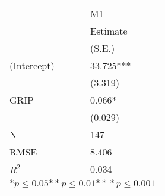\begin{tabular}{*{2}{l}}
\hline
                  & M1   \tabularnewline
                   &Estimate \tabularnewline
                 &(S.E.) \tabularnewline
 \hline
 \hline
   (Intercept)     &33.725*** \tabularnewline
                 &(3.319)  \tabularnewline
   GRIP            &0.066* \tabularnewline
                 &(0.029)  \tabularnewline
 \hline
 N                 &147       \tabularnewline
 RMSE             &8.406   \tabularnewline
 $R^2$             &0.034   \tabularnewline
 \hline
\hline
 
 \multicolumn{2}{c}{${*  p}\le 0.05$${*\!\!*  p}\le 0.01$${*\!\!*\!\!*  p}\le 0.001$}\tabularnewline
 \end{tabular}